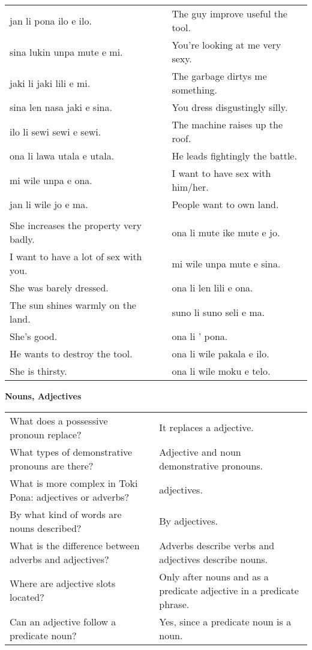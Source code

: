 \begin{supertabular}{p{5,5cm}|ll}
jan li pona ilo e ilo. && The guy improve useful the tool. \\ %
sina lukin unpa mute e mi. && You're looking at me very sexy.   \\ %
jaki li jaki lili e mi. && The garbage dirtys me something. \\ %
sina len nasa jaki e sina. && You dress disgustingly silly. \\ %
ilo li sewi sewi e sewi. && The machine raises up the roof. \\ %
ona li lawa utala e utala. && He leads fightingly the battle. \\ %
mi wile unpa e ona. && I want to have sex with him/her.  \\
jan li wile jo e ma. && People want to own land. \\
 && \\ %
She increases the property very badly. && ona li mute ike mute e jo. \\
I want to have a lot of sex with you. && mi wile unpa mute e sina. \\
She was barely dressed. && ona li len lili e ona. \\
The sun shines warmly on the land. && suno li suno seli e ma. \\
She's good. && ona li ' pona. \\
He wants to destroy the tool. && ona li wile pakala e ilo. \\ %
She is thirsty. && ona li wile moku e telo. \\ %
\end{supertabular} 

\textbf{Nouns, Adjectives} 
\label{'adjectives'}

\begin{supertabular}{p{5,5cm}|ll}
What does a possessive pronoun replace? && It replaces a adjective. \\ %
What types of demonstrative pronouns are there? && Adjective and noun demonstrative pronouns.  \\ %
What is more complex in Toki Pona: adjectives or adverbs? && adjectives.  \\ %
By what kind of words are nouns described? && By adjectives.  \\ %
What is the difference between adverbs and adjectives? && Adverbs describe verbs and adjectives describe nouns. \\ %
Where are adjective slots located? && Only after nouns and as a predicate adjective in a predicate phrase. \\ %
Can an adjective follow a predicate noun? && Yes, since a predicate noun is a noun.  \\ %
\end{supertabular} 

